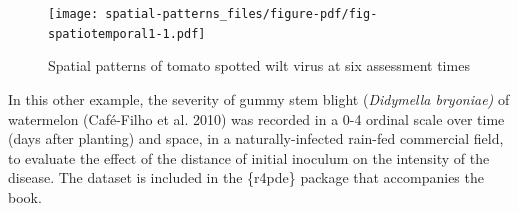 \documentclass[
  letterpaper,
]{book}
\newenvironment{Shaded}{\begin{snugshade}}{\end{snugshade}}
\newcommand{\AttributeTok}[1]{\textcolor[rgb]{0.40,0.45,0.13}{#1}}
\newcommand{\DecValTok}[1]{\textcolor[rgb]{0.68,0.00,0.00}{#1}}
\newcommand{\FunctionTok}[1]{\textcolor[rgb]{0.28,0.35,0.67}{#1}}
\newcommand{\NormalTok}[1]{\textcolor[rgb]{0.00,0.23,0.31}{#1}}
\newcommand{\OtherTok}[1]{\textcolor[rgb]{0.00,0.23,0.31}{#1}}
\newcommand{\SpecialCharTok}[1]{\textcolor[rgb]{0.37,0.37,0.37}{#1}}
\newcommand{\StringTok}[1]{\textcolor[rgb]{0.13,0.47,0.30}{#1}}
\begin{document}
\begin{Shaded}
\end{Shaded}

\begin{figure}[H]

{\centering \texttt{[image: spatial-patterns\_files/figure-pdf/fig-spatiotemporal1-1.pdf]}

}

\caption{\label{fig-spatiotemporal1}Spatial patterns of tomato spotted
wilt virus at six assessment times}

\end{figure}

In this other example, the severity of gummy stem blight
(\emph{Didymella bryoniae)} of watermelon (Café-Filho et al. 2010) was
recorded in a 0-4 ordinal scale over time (days after planting) and
space, in a naturally-infected rain-fed commercial field, to evaluate
the effect of the distance of initial inoculum on the intensity of the
disease. The dataset is included in the \{r4pde\} package that
accompanies the book.
\end{document}
